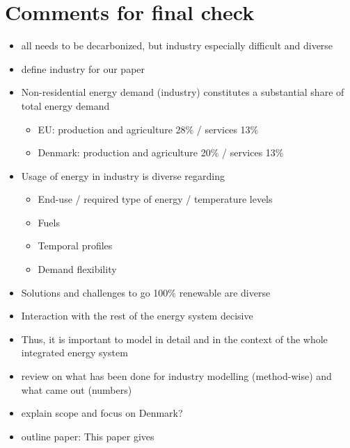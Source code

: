 \documentclass[review]{elsarticle}
\begin{document}



\section*{Comments for final check}

\begin{itemize}
    \item all needs to be decarbonized, but industry especially difficult and diverse
    \item define industry for our paper
    \item Non-residential energy demand (industry) constitutes a
substantial share of total energy demand
    \begin{itemize}
        \item EU: production and agriculture 28\% / services 13\% \cite{Eurostat2017}
        \item Denmark: production and agriculture 20\% / services 13\% \cite{DanishEnergyAgency2014}
    \end{itemize}
    \item Usage of energy in industry is diverse regarding
        \begin{itemize}
            \item End-use / required type of energy / temperature levels
            \item Fuels
            \item Temporal profiles
            \item Demand flexibility
        \end{itemize}
    \item Solutions and challenges to go 100\% renewable are diverse
    \item Interaction with the rest of the energy system decisive
    \item Thus, it is important to model in detail and in the context of the whole integrated energy system
    \item review on what has been done for industry modelling (method-wise) and what came out (numbers)
    \item explain scope and focus on Denmark?
    \item outline paper: This paper gives 
\end{itemize}
\end{document}
